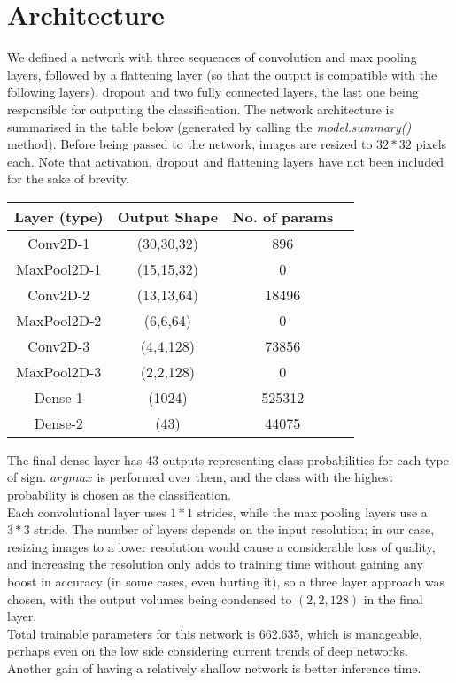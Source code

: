 \section{Architecture}
We defined a network with three sequences of convolution and max pooling layers, followed by a flattening layer (so that the output is compatible with the following layers), dropout and two fully connected layers, the last one being responsible for outputing the classification. The network architecture is summarised in the table below (generated by calling the \textit{model.summary()} method). Before being passed to the network, images are resized to $32*32$ pixels each. Note that activation, dropout and flattening layers have not been included for the sake of brevity.
\begin{center}
 \begin{tabular}{||c | c | c | c||} 
 \hline
 Layer (type) & Output Shape &  No. of params \\ [0.5ex] 
 \hline\hline
 Conv2D-1 & (30,30,32) & 896 \\ 
 \hline
 MaxPool2D-1 & (15,15,32) & 0 \\
 \hline
 Conv2D-2 & (13,13,64) & 18496\\
 \hline
 MaxPool2D-2 & (6,6,64) & 0\\
 \hline
 Conv2D-3 & (4,4,128) & 73856\\ [1ex] 
 \hline
 MaxPool2D-3 & (2,2,128) & 0\\
 \hline
 Dense-1 & (1024) & 525312\\
 \hline
 Dense-2 & (43) & 44075\\
 \hline\hline
\end{tabular}
\end{center}

The final dense layer has 43 outputs representing class probabilities for each type of sign. $argmax$ is performed over them, and the class with the highest probability is chosen as the classification.\\
Each convolutional layer uses $1*1$ strides, while the max pooling layers use a $3*3$ stride. The number of layers depends on the input resolution; in our case, resizing images to a lower resolution would cause a considerable loss of quality, and increasing the resolution only adds to training time without gaining any boost in accuracy (in some cases, even hurting it), so a three layer approach was chosen, with the output volumes being condensed to $(2,2,128)$ in the final layer. \\
Total trainable parameters for this network is 662.635, which is manageable, perhaps even on the low side considering current trends of deep networks. Another gain of having a relatively shallow network is better inference time.
